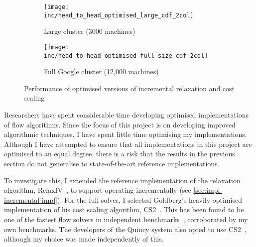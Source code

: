 \begin{figure}
    \begin{widepage}
        \begin{subfigure}[c]{0.5\textwidth}
            \texttt{[image: inc/head\_to\_head\_optimised\_large\_cdf\_2col]}
            \caption{Large cluster (3000 machines)}
            \label{fig:inc-head-to-head-optimised:large}
        \end{subfigure}
        \begin{subfigure}[c]{0.5\textwidth}
            \texttt{[image: inc/head\_to\_head\_optimised\_full\_size\_cdf\_2col]}
            \caption{Full Google cluster (12,000 machines)}
            \label{fig:inc-head-to-head-optimised:full-size}
        \end{subfigure}
    \end{widepage}
    \caption{Performance of optimised versions of incremental relaxation and cost scaling}
    \label{fig:inc-head-to-head-optimised}
\end{figure}

Researchers have spent considerable time developing optimised implementations of flow algorithms. Since the focus of this project is on developing improved algorithmic techniques, I have spent little time optimising my implementations. Although I have attempted to ensure that all implementations in this project are optimised to an equal degree, there is a risk that the results in the previous section do not generalise to state-of-the-art reference implementations. 

To investigate this, I extended the reference implementation of the relaxation algorithm, RelaxIV~\cite{RelaxIV:2011}, to support operating incrementally (see \cref{sec:impl-incremental-impl}). For the full solver, I selected Goldberg's heavily optimised implementation of his cost scaling algorithm, CS2~\cite{CS2:2009}. This has been found to be one of the fastest flow solvers in independent benchmarks~\cite{KiralyKovacs:2012}, corroborated by my own benchmarks. The developers of the Quincy system also opted to use CS2~\cite{Isard:2009}, although my choice was made independently of this.

